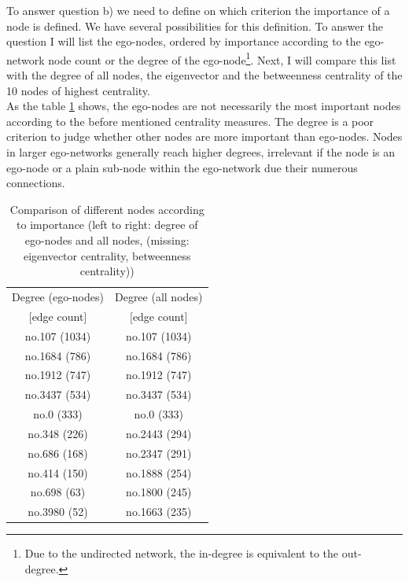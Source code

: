 To answer question b) we need to define on which criterion the importance of a node is defined. We have several possibilities for this definition. To answer the question I will list the ego-nodes, ordered by importance according to the ego-network node count or the degree of the ego-node\footnote{Due to the undirected network, the in-degree is equivalent to the out-degree.}. Next, I will compare this list with the degree of all nodes, the eigenvector and the betweenness centrality of the 10 nodes of highest centrality.\\

As the table \ref{tab:importance_nodes} shows, the ego-nodes are not necessarily the most important nodes according to the before mentioned centrality measures. The degree is a poor criterion to judge whether other nodes are more important than ego-nodes. Nodes in larger ego-networks generally reach higher degrees, irrelevant if the node is an ego-node or a plain sub-node within the ego-network due their numerous connections. 

\begin{table}[h]
	\centering
	\begin{tabular}{|c|c|}
		\hline 
		Degree (ego-nodes) 	& Degree (all nodes)\\ 
		$[$edge count$]$ 	& $[$edge count$]$\\ 
		\hline 
		no.107 (1034) 		& no.107 (1034)\\ 
		\hline 
		no.1684 (786) 		& no.1684 (786)\\ 
		\hline 
		no.1912 (747)		& no.1912 (747)\\ 
		\hline 
		no.3437 (534) 		& no.3437 (534)\\ 
		\hline 
		no.0 (333)    		& no.0 (333)\\ 
		\hline 
		no.348 (226)  		& no.2443 (294)\\ 
		\hline 
		no.686 (168)  		& no.2347 (291)\\ 
		\hline 
		no.414 (150)  		& no.1888 (254)\\ 
		\hline 
		no.698 (63)			& no.1800 (245)\\ 
		\hline 
		no.3980 (52)		& no.1663 (235)\\ 
		\hline 
	\end{tabular} 
	\caption{Comparison of different nodes according to importance (left to right: degree of ego-nodes and all nodes, (missing: eigenvector centrality, betweenness centrality))}
	\label{tab:importance_nodes}
\end{table}
